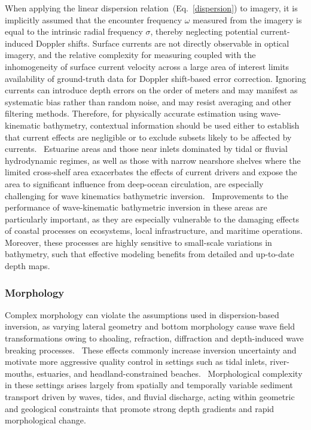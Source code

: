 \documentclass[12pt]{article}
\begin{document}
When applying the linear dispersion relation~(Eq.~\ref{dispersion}) to imagery, it is implicitly assumed that the encounter frequency $\omega$ measured from the imagery is equal to the intrinsic radial frequency $\sigma$, thereby neglecting potential current-induced Doppler shifts. Surface currents are not directly observable in optical imagery, and the relative complexity for measuring coupled with the inhomogeneity of surface current velocity across a large area of interest limits availability of ground-truth data for Doppler shift-based error correction. Ignoring currents can introduce depth errors on the order of meters and may manifest as systematic bias rather than random noise, and may resist averaging and other filtering methods. Therefore, for physically accurate estimation using wave-kinematic bathymetry, contextual information should be used either to establish that current effects are negligible or to exclude subsets likely to be affected by currents.~\cite{Mudiyanselage2024} Estuarine areas and those near inlets dominated by tidal or fluvial hydrodynamic regimes, as well as those with narrow nearshore shelves where the limited cross-shelf area exacerbates the effects of current drivers and expose the area to significant influence from deep-ocean circulation, are especially challenging for wave kinematics bathymetric inversion.~\cite{Todd2019} Improvements to the performance of wave-kinematic bathymetric inversion in these areas are particularly important, as they are especially vulnerable to the damaging effects of coastal processes on ecosystems, local infrastructure, and maritime operations. Moreover, these processes are highly sensitive to small-scale variations in bathymetry, such that effective modeling benefits from detailed and up-to-date depth maps.~\cite{Honegger2018}

\subsubsection{Morphology}

Complex morphology can violate the assumptions used in dispersion-based inversion, as varying lateral geometry and bottom morphology cause wave field transformations owing to shoaling, refraction, diffraction and depth-induced wave breaking processes.~\cite{Honegger2018} These effects commonly increase inversion uncertainty and motivate more aggressive quality control in settings such as tidal inlets, river-mouths, estuaries, and headland-constrained beaches.~\cite{Honegger2018} Morphological complexity in these settings arises largely from spatially and temporally variable sediment transport driven by waves, tides, and fluvial discharge, acting within geometric and geological constraints that promote strong depth gradients and rapid morphological change.~\cite{Honegger2018} 
\end{document}
